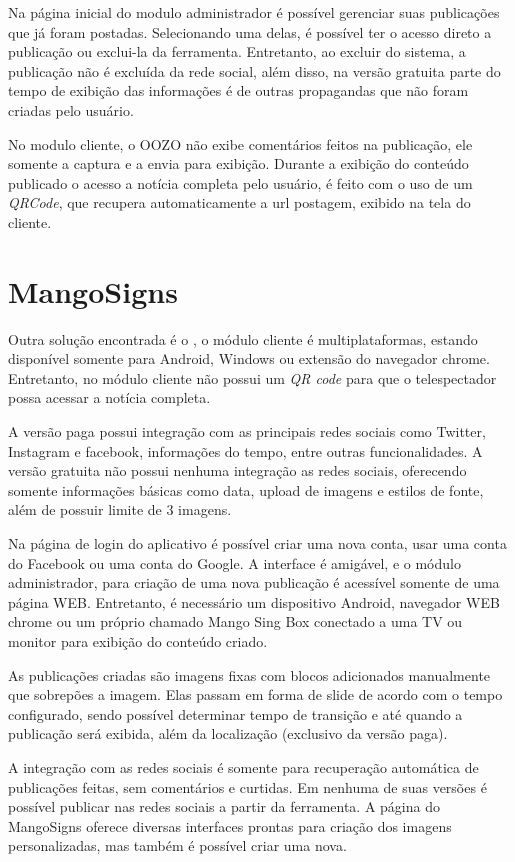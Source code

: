 Na página inicial do modulo administrador é possível gerenciar suas publicações que já foram postadas. Selecionando uma delas, é possível ter o acesso direto a publicação ou exclui-la da ferramenta. Entretanto, ao excluir do sistema, a publicação não é excluída da rede social, além disso, na versão gratuita parte do tempo de exibição das informações é de outras propagandas que não foram criadas pelo usuário. 

No modulo cliente, o OOZO não exibe comentários feitos na publicação, ele somente a captura e a envia para exibição. Durante a exibição do conteúdo publicado o acesso a notícia completa pelo usuário, é feito com o uso de um \textit{QRCode}, que recupera automaticamente a url postagem, exibido na tela do cliente.

\section{MangoSigns}
\label{sec:mango}
Outra solução encontrada é o \cite{mango2017}, o módulo cliente é multiplataformas, estando disponível somente para Android, Windows ou extensão do navegador chrome. Entretanto, no módulo cliente não possui um \textit{QR code} para que o telespectador possa acessar a notícia completa.

A versão paga possui integração com as principais redes sociais como Twitter, Instagram e facebook, informações do tempo, entre outras funcionalidades. A versão gratuita não possui nenhuma integração as redes sociais, oferecendo somente informações básicas como data, upload de imagens e estilos de fonte, além de possuir limite de 3 imagens.

Na página de login do aplicativo é possível criar uma nova conta, usar uma conta do Facebook ou uma conta do Google. A interface é amigável, e o módulo administrador, para criação de uma nova publicação é acessível somente de uma página WEB. Entretanto, é necessário um dispositivo Android, navegador WEB chrome ou um próprio chamado Mango Sing Box conectado a uma TV ou monitor para exibição do conteúdo criado.

As publicações criadas são imagens fixas com blocos adicionados manualmente que sobrepões a imagem. Elas passam em forma de slide de acordo com o tempo configurado, sendo possível determinar tempo de transição e até quando a publicação será exibida, além da localização (exclusivo da versão paga). 

A integração com as redes sociais é somente para recuperação automática de publicações feitas, sem comentários e curtidas. Em nenhuma de suas versões é possível publicar nas redes sociais a partir da ferramenta. A página do MangoSigns oferece diversas interfaces prontas para criação dos imagens personalizadas, mas também é possível criar uma nova. 


